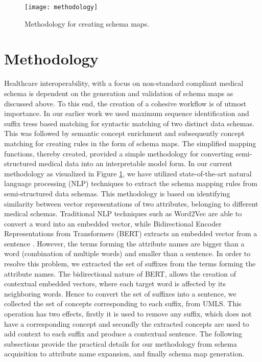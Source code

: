 \documentclass{ieeeaccess}
\begin{document}
\begin{figure}[t!]
	\centering
	\texttt{[image: methodology]}
	\caption{Methodology for creating schema maps.}
	\label{fig:methodology}
\end{figure} 

\section{Methodology}
\label{methodology}
Healthcare interoperability, with a focus on non-standard compliant medical schema is dependent on the generation and validation of schema maps as discussed above. To this end, the creation of a cohesive workflow is of utmost importance. In our earlier work \cite{Satti2020} we used maximum sequence identification and suffix tress based matching for syntactic matching of two distinct data schemas. This was followed by semantic concept enrichment and subsequently concept matching for creating rules in the form of schema maps. The simplified mapping functions, thereby created, provided a simple methodology for converting semi-structured medical data into an interpretable model form.
In our current methodology as visualized in Figure \ref{methodology}, we have utilized state-of-the-art natural language processing (NLP) techniques to extract the schema mapping rules from semi-structured data schemas. This methodology is based on identifying similarity between vector representations of two attributes, belonging to different medical schemas. 
Traditional NLP techniques such as Word2Vec are able to convert a word into an embedded vector, while Bidirectional Encoder Representations from Transformers (BERT) extracts an embedded vector from a sentence \cite{zhu2018exploring}. However, the terms forming the attribute names are bigger than a word (combination of multiple words) and smaller than a sentence. In order to resolve this problem, we extracted the set of suffixes from the terms forming the attribute names. The bidirectional nature of BERT, allows the creation of contextual embedded vectors, where each target word is affected by its neighboring words. Hence to convert the set of suffixes into a sentence, we collected the set of concepts corresponding to each suffix, from UMLS. This operation has two effects, firstly it is used to remove any suffix, which does not have a corresponding concept and secondly the extracted concepts are used to add context to each suffix and produce a contextual sentence. 
The following subsections provide the practical details for our methodology from schema acquisition to attribute name expansion, and finally schema map generation.
\end{document}
